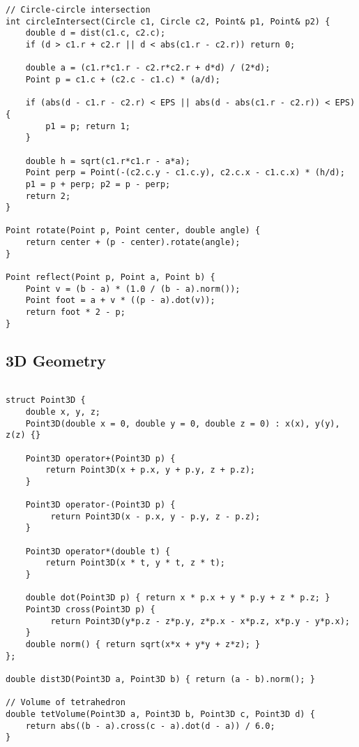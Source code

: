 \documentclass[11pt,a4paper]{article}
\begin{document}
\newpage

\begin{lstlisting}[caption={Circle Intersection and Transformations}]
// Circle-circle intersection
int circleIntersect(Circle c1, Circle c2, Point& p1, Point& p2) {
    double d = dist(c1.c, c2.c);
    if (d > c1.r + c2.r || d < abs(c1.r - c2.r)) return 0;
    
    double a = (c1.r*c1.r - c2.r*c2.r + d*d) / (2*d);
    Point p = c1.c + (c2.c - c1.c) * (a/d);
    
    if (abs(d - c1.r - c2.r) < EPS || abs(d - abs(c1.r - c2.r)) < EPS) {
        p1 = p; return 1;
    }
    
    double h = sqrt(c1.r*c1.r - a*a);
    Point perp = Point(-(c2.c.y - c1.c.y), c2.c.x - c1.c.x) * (h/d);
    p1 = p + perp; p2 = p - perp;
    return 2;
}

Point rotate(Point p, Point center, double angle) {
    return center + (p - center).rotate(angle);
}

Point reflect(Point p, Point a, Point b) {
    Point v = (b - a) * (1.0 / (b - a).norm());
    Point foot = a + v * ((p - a).dot(v));
    return foot * 2 - p;
}
\end{lstlisting}

\newpage

\subsection{3D Geometry}
\begin{lstlisting}[caption={3D Point and Vector Operations}]

struct Point3D {
    double x, y, z;
    Point3D(double x = 0, double y = 0, double z = 0) : x(x), y(y), z(z) {}
    
    Point3D operator+(Point3D p) { 
        return Point3D(x + p.x, y + p.y, z + p.z);
    }

    Point3D operator-(Point3D p) {
         return Point3D(x - p.x, y - p.y, z - p.z);
    }

    Point3D operator*(double t) { 
        return Point3D(x * t, y * t, z * t); 
    }
    
    double dot(Point3D p) { return x * p.x + y * p.y + z * p.z; }
    Point3D cross(Point3D p) {
         return Point3D(y*p.z - z*p.y, z*p.x - x*p.z, x*p.y - y*p.x); 
    }
    double norm() { return sqrt(x*x + y*y + z*z); }
};

double dist3D(Point3D a, Point3D b) { return (a - b).norm(); }

// Volume of tetrahedron
double tetVolume(Point3D a, Point3D b, Point3D c, Point3D d) {
    return abs((b - a).cross(c - a).dot(d - a)) / 6.0;
}
\end{lstlisting}
\end{document}
